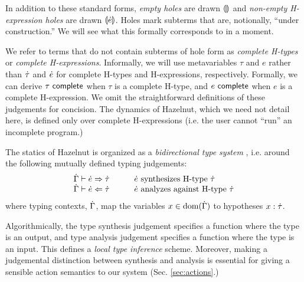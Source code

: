 \documentclass{llncs}
\begin{document}
In addition to these standard forms, \emph{empty holes} are drawn $\llparenthesis\rrparenthesis$ and \emph{non-empty H-expression holes} are drawn $\llparenthesis\dot{e}\rrparenthesis$. Holes mark subterms that are, notionally, ``under construction.'' We will see what this formally corresponds to in a moment.

We refer to terms that do not contain subterms of hole form as \emph{complete H-types} or \emph{complete H-expressions}. Informally, we will use metavariables $\tau$ and $e$ rather than $\dot{\tau}$ and $\dot{e}$ for complete H-types and H-expressions, respectively. Formally, we can derive $\tau~\mathsf{complete}$ when $\tau$ is a complete H-type, and $e~\mathsf{complete}$ when $e$ is a complete H-expression. We omit the straightforward definitions of these judgements for concision. The dynamics of Hazelnut, which we need not detail here, is defined only  over complete H-expressions (i.e. the user cannot ``run'' an incomplete program.)

The statics of Hazelnut is organized as a \emph{bidirectional type system} \cite{Pierce:2000:LTI:345099.345100}, i.e. around the following mutually defined typing judgements:
\[\arraycolsep=15pt\begin{array}{ll}
\hsyn{\hGamma}{\hexp}{\htau} & \text{$\hexp$ synthesizes H-type $\htau$}\\
\hana{\hGamma}{\hexp}{\htau} & \text{$\hexp$ analyzes against H-type $\htau$}
\end{array}\]
where typing contexts, $\dot{\Gamma}$, map the variables $x \in \text{dom}(\dot{\Gamma})$ to hypotheses $x : \dot{\tau}$. 

Algorithmically, the type synthesis judgement specifies a function where the type is an output, and type analysis judgement specifies a function where the type is an input. This defines a \emph{local type inference} scheme. Moreover, making a judgemental distinction between synthesis and analysis is essential for giving a sensible action semantics to our system (Sec. \ref{sec:actions}.)

\end{document}

